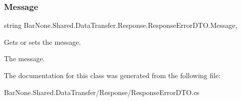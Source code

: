 \subsubsection{\texorpdfstring{Message}{Message}}
{\footnotesize\ttfamily string Bar\+None.\+Shared.\+Data\+Transfer.\+Response.\+Response\+Error\+D\+T\+O.\+Message\hspace{0.3cm}{\ttfamily [get]}, {\ttfamily [set]}}



Gets or sets the message. 

The message. 

The documentation for this class was generated from the following file\+:\begin{DoxyCompactItemize}
\item 
Bar\+None.\+Shared.\+Data\+Transfer/\+Response/Response\+Error\+D\+T\+O.\+cs\end{DoxyCompactItemize}
